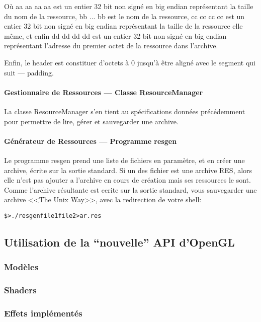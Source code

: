 \documentclass[11pt, a4paper, titlepage]{article}
\begin{document}
Où aa aa aa aa est un entier 32 bit non signé en big endian représentant la taille du nom de la ressource, bb ... bb est le nom de la ressource,
cc cc cc cc est un entier 32 bit non signé en big endian représentant la taille de la ressource elle même, et enfin dd dd dd dd est
un entier 32 bit non signé en big endian représentant l'adresse du premier octet de la ressource dans  l'archive.

Enfin, le header est constituer d'octets à 0 jusqu'à être aligné avec le segment qui suit --- padding.

\paragraph{Gestionnaire de Ressources --- Classe ResourceManager}

La classe ResourceManager s'en tient au spécifications données précédemment pour permettre de lire, gérer et sauvegarder une archive. 

\paragraph{Générateur de Ressources  --- Programme resgen}

Le programme resgen prend une liste de fichiers en paramètre, et en créer une archive, écrite sur la sortie standard.
Si un des fichier est une archive RES, alors elle n'est pas ajouter a l'archive en cours de création mais ses ressources le sont.
Comme l'archive résultante est ecrite sur la sortie standard, vous sauvegarder une archive <<The Unix Way>>, avec la redirection de votre shell:
 
\begin{alltt}
\$> ./resgen file1 file2 >  ar.res
\end{alltt}

\subsection{Utilisation de la ``nouvelle'' API d'OpenGL}

\subsubsection{Modèles}

\subsubsection{Shaders}

\subsubsection{Effets implémentés}
\end{document}

